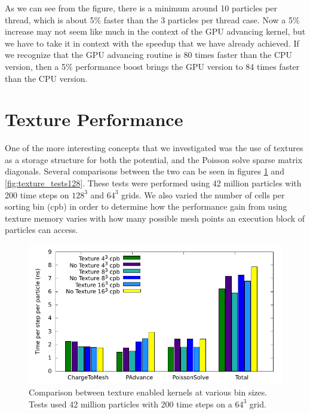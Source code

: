 As we can see from the figure, there is a minimum around 10 particles per thread, which is about 5\% faster than the 3 particles per thread case. Now a 5\% increase may not seem like much in the context of the GPU advancing kernel, but we have to take it in context with the speedup that we have already achieved. If we recognize that the GPU advancing routine is 80 times faster than the CPU version, then a 5\% performance boost brings the GPU version to 84 times faster than the CPU version. 

	\section{Texture Performance}

One of the more interesting concepts that we investigated was the use of textures as a storage structure for both the potential, and the Poisson solve sparse matrix diagonals. Several comparisons between the two can be seen in figures \ref{fig:texture_tests64} and \ref{fig:texture_tests128}. These tests were performed using 42 million particles with 200 time steps on $128^3$ and $64^3$ grids. We also varied the number of cells per sorting bin (cpb) in order to determine how the performance gain from using texture memory varies with how many possible mesh points an execution block of particles can access.

\begin{figure}
\begin{center}
\includegraphics[width=6in]{performance/texture_tests64.pdf}
\end{center}
\caption{Comparison between texture enabled kernels at various bin sizes. Tests used 42 million particles with 200 time steps on a $64^3$ grid.}
\label{fig:texture_tests64}
\end{figure}

